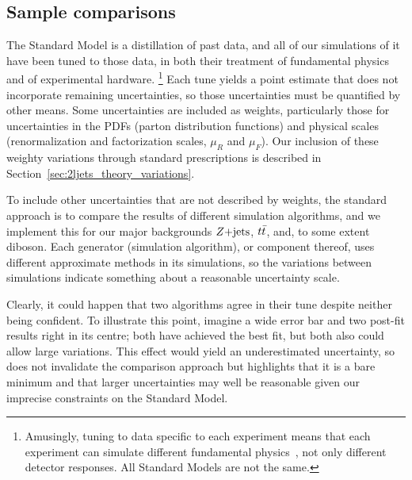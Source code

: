 \subsection{Sample comparisons}
\label{sec:2ljets_sample_comparisons}
The Standard Model is a distillation of past data, and all of our simulations
of it have been tuned to those data, in both their treatment of fundamental
physics and of experimental hardware.%
\footnote{%
Amusingly, tuning to data specific to each experiment means that each
experiment can simulate different fundamental physics~\cite{
herwig2000parameter,
Altarelli:473529
}, not only different detector responses.
All Standard Models are not the same.
}
Each tune yields a point estimate that does not incorporate remaining
uncertainties, so those uncertainties must be quantified by other means.
Some uncertainties are included as weights, particularly those for
uncertainties in the
PDFs (parton distribution functions) and physical scales
(renormalization and factorization scales, $\mu_R$ and $\mu_F$).
Our inclusion of these weighty variations through standard prescriptions is
described in Section~\ref{sec:2ljets_theory_variations}.

To include other uncertainties that are not described by weights,
the standard approach is to compare the results of different simulation
algorithms, and we implement this for our major backgrounds $Z\mathrm{+jets}$, $t\bar t$,
and, to some extent diboson.
Each generator (simulation algorithm), or component thereof, uses different
approximate methods in its simulations, so the variations between simulations
indicate something about a reasonable uncertainty scale.

Clearly, it could happen that two algorithms agree in their tune despite
neither being confident.
To illustrate this point, imagine a wide error bar and
two post-fit results right in its centre;
both have achieved the best fit, but both also could allow large variations.
This effect would yield an underestimated uncertainty, so does not invalidate
the comparison approach but highlights that it is a bare minimum and that
larger uncertainties may well be reasonable given our imprecise constraints on
the Standard Model.

